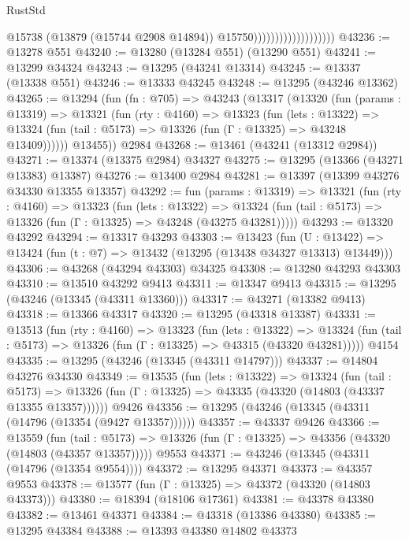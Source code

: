 \begin{lexlean}{RustStd}
\begin{coremodule}
                                          @15738
                                          (@13879 (@15744 @2908 @14894))
                                          @15750)))))))))))))))))))
@43236 := @13278 @551
@43240 := @13280 (@13284 @551) (@13290 @551)
@43241 := @13299 @34324
@43243 := @13295 (@43241 @13314)
@43245 := @13337 (@13338 @551)
@43246 := @13333 @43245
@43248 := @13295 (@43246 @13362)
@43265 := @13294
    (fun (fn : @705) =>
    @43243
      (@13317
        (@13320
          (fun (params : @13319) =>
          @13321
            (fun (rty : @4160) =>
            @13323
              (fun (lets : @13322) =>
              @13324 (fun (tail : @5173) => @13326 (fun (Γ : @13325) => @43248 @13409))))))
        @13455))
    @2984
@43268 := @13461 (@43241 (@13312 @2984))
@43271 := @13374 (@13375 @2984) @34327
@43275 := @13295 (@13366 (@43271 @13383) @13387)
@43276 := @13400 @2984
@43281 := @13397 (@13399 @43276 @34330 @13355 @13357)
@43292 := fun (params : @13319) =>
  @13321
    (fun (rty : @4160) =>
    @13323
      (fun (lets : @13322) =>
      @13324 (fun (tail : @5173) => @13326 (fun (Γ : @13325) => @43248 (@43275 @43281)))))
@43293 := @13320 @43292
@43294 := @13317 @43293
@43303 := @13423
    (fun (U : @13422) => @13424 (fun (t : @7) => @13432 (@13295 (@13438 @34327 @13313) @13449)))
@43306 := @43268 (@43294 @43303) @34325
@43308 := @13280 @43293 @43303
@43310 := @13510 @43292 @9413
@43311 := @13347 @9413
@43315 := @13295 (@43246 (@13345 (@43311 @13360)))
@43317 := @43271 (@13382 @9413)
@43318 := @13366 @43317
@43320 := @13295 (@43318 @13387)
@43331 := @13513
    (fun (rty : @4160) =>
    @13323
      (fun (lets : @13322) =>
      @13324 (fun (tail : @5173) => @13326 (fun (Γ : @13325) => @43315 (@43320 @43281)))))
    @4154
@43335 := @13295 (@43246 (@13345 (@43311 @14797)))
@43337 := @14804 @43276 @34330
@43349 := @13535
    (fun (lets : @13322) =>
    @13324
      (fun (tail : @5173) =>
      @13326 (fun (Γ : @13325) => @43335 (@43320 (@14803 (@43337 @13355 @13357))))))
    @9426
@43356 := @13295 (@43246 (@13345 (@43311 (@14796 (@13354 (@9427 @13357))))))
@43357 := @43337 @9426
@43366 := @13559
    (fun (tail : @5173) => @13326 (fun (Γ : @13325) => @43356 (@43320 (@14803 (@43357 @13357)))))
    @9553
@43371 := @43246 (@13345 (@43311 (@14796 (@13354 @9554))))
@43372 := @13295 @43371
@43373 := @43357 @9553
@43378 := @13577 (fun (Γ : @13325) => @43372 (@43320 (@14803 @43373)))
@43380 := @18394 (@18106 @17361)
@43381 := @43378 @43380
@43382 := @13461 @43371
@43384 := @43318 (@13386 @43380)
@43385 := @13295 @43384
@43388 := @13393 @43380 @14802 @43373

\end{coremodule}
\end{lexlean}
